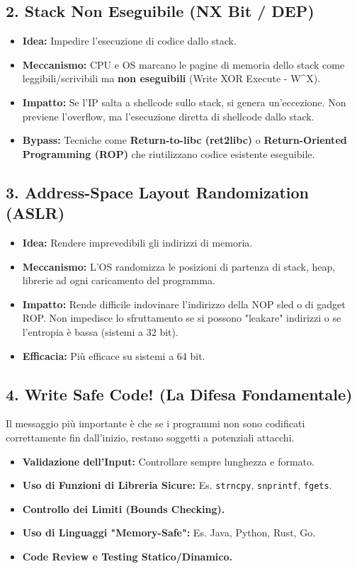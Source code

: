 \subsection{2. Stack Non Eseguibile (NX Bit / DEP)}
\begin{itemize}
    \item \textbf{Idea:} Impedire l'esecuzione di codice dallo stack.
    \item \textbf{Meccanismo:} CPU e OS marcano le pagine di memoria dello stack come leggibili/scrivibili ma \textbf{non eseguibili} (Write XOR Execute - W\textasciicircum X).
    \item \textbf{Impatto:} Se l'IP salta a shellcode sullo stack, si genera un'eccezione. Non previene l'overflow, ma l'esecuzione diretta di shellcode dallo stack.
    \item \textbf{Bypass:} Tecniche come \textbf{Return-to-libc (ret2libc)} o \textbf{Return-Oriented Programming (ROP)} che riutilizzano codice esistente eseguibile.
\end{itemize}

\subsection{3. Address-Space Layout Randomization (ASLR)}
\begin{itemize}
    \item \textbf{Idea:} Rendere imprevedibili gli indirizzi di memoria.
    \item \textbf{Meccanismo:} L'OS randomizza le posizioni di partenza di stack, heap, librerie ad ogni caricamento del programma.
    \item \textbf{Impatto:} Rende difficile indovinare l'indirizzo della NOP sled o di gadget ROP. Non impedisce lo sfruttamento se si possono "leakare" indirizzi o se l'entropia è bassa (sistemi a 32 bit).
    \item \textbf{Efficacia:} Più efficace su sistemi a 64 bit.
\end{itemize}

\subsection{4. Write Safe Code! (La Difesa Fondamentale)}
Il messaggio più importante è che se i programmi non sono codificati correttamente fin dall'inizio, restano soggetti a potenziali attacchi.
\begin{itemize}
    \item \textbf{Validazione dell'Input:} Controllare sempre lunghezza e formato.
    \item \textbf{Uso di Funzioni di Libreria Sicure:} Es. \texttt{strncpy}, \texttt{snprintf}, \texttt{fgets}.
    \item \textbf{Controllo dei Limiti (Bounds Checking).}
    \item \textbf{Uso di Linguaggi "Memory-Safe":} Es. Java, Python, Rust, Go.
    \item \textbf{Code Review e Testing Statico/Dinamico.}
\end{itemize}

